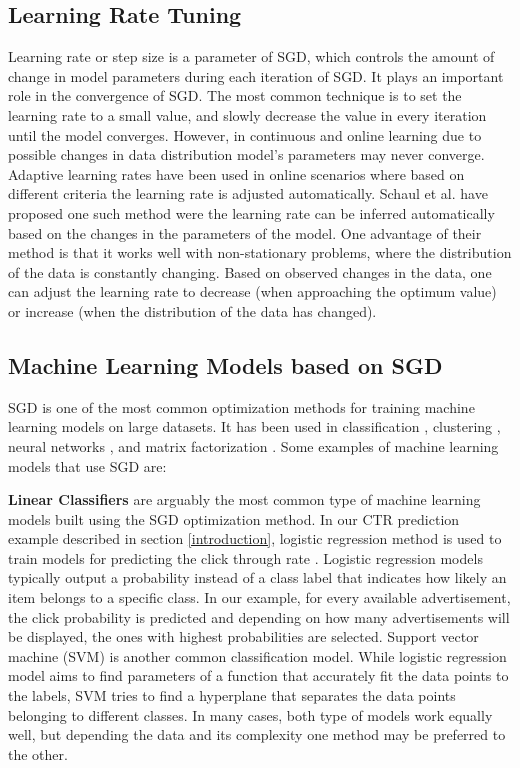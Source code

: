 \documentclass{vldb}
\begin{document}
\subsection{Learning Rate Tuning} \label{learning-rate}
Learning rate or step size is a parameter of SGD, which controls the amount of change in model parameters during each iteration of SGD.
It plays an important role in the convergence of SGD.
The most common technique is to set the learning rate to a small value, and slowly decrease the value in every iteration until the model converges.
However, in continuous and online learning due to possible changes in data distribution model's parameters may never converge.
Adaptive learning rates have been used in online scenarios where based on different criteria the learning rate is adjusted automatically.
Schaul et al. \cite{schaul2013no} have proposed one such method were the learning rate can be inferred automatically based on the changes in the parameters of the model. 
One advantage of their method is that it works well with non-stationary problems, where the distribution of the data is constantly changing. 
Based on observed changes in the data, one can adjust the learning rate to decrease (when approaching the optimum value) or increase (when the distribution of the data has changed).

\subsection{Machine Learning Models based on SGD}
SGD is one of the most common optimization methods for training machine learning models on large datasets. 
It has been used in classification \cite{zhang2004solving}, clustering \cite{bottou1995convergence}, neural networks \cite{dean2012large}, and matrix factorization \cite{funk2006netflix}.
Some examples of machine learning models that use SGD are: 

\textbf{Linear Classifiers} are arguably the most common type of machine learning models built using the SGD optimization method. 
In our CTR prediction example described in section \ref{introduction}, logistic regression method is used to train models for predicting the click through rate \cite{macmahan2013}. 
Logistic regression models typically output a probability instead of a class label \cite{hosmer2013applied} that indicates how likely an item belongs to a specific class.
In our example, for every available advertisement, the click probability is predicted and depending on how many advertisements will be displayed, the ones with highest probabilities are selected.
Support vector machine (SVM) \cite{steinwart2008support} is another common classification model.
While logistic regression model aims to find parameters of a function that accurately fit the data points to the labels, SVM tries to find a hyperplane that separates the data points belonging to different classes.
In many cases, both type of models work equally well, but depending the data and its complexity one method may be preferred to the other.
\end{document}
